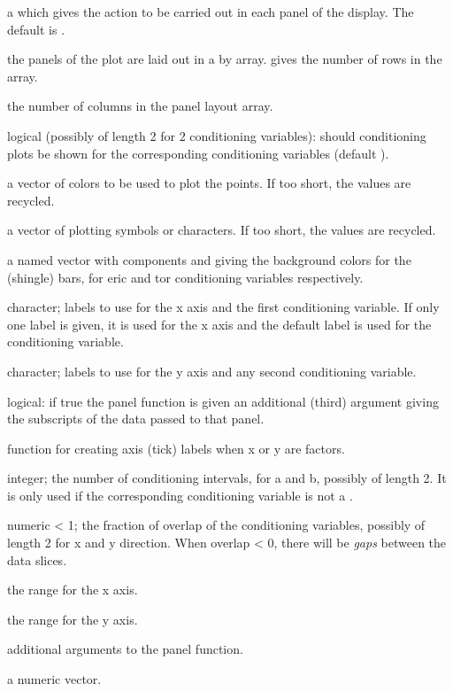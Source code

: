 \begin{Arguments}
\begin{ldescription}
\item[\code{panel}] a 
which gives the action to be carried out in
each panel of the display.  The default is .
\item[\code{rows}] the panels of the plot are laid out in a  by
 array.   gives the number of rows in the
array.
\item[\code{columns}] the number of columns in the panel layout array.
\item[\code{show.given}] logical (possibly of length 2 for 2 conditioning
variables): should conditioning plots be shown for the
corresponding conditioning variables (default ).
\item[\code{col}] a vector of colors to be used to plot the points.  If too
short, the values are recycled.
\item[\code{pch}] a vector of plotting symbols or characters.  If too short,
the values are recycled.
\item[\code{bar.bg}] a named vector with components  and
 giving the background colors for the (shingle) bars,
for eric and tor conditioning variables respectively.
\item[\code{xlab}] character; labels to use for the x axis and the
first conditioning variable.  If only one label is given, it is used
for the x axis and the default label is used for the conditioning
variable.
\item[\code{ylab}] character; labels to use for the y axis and any
second conditioning variable.
\item[\code{subscripts}] logical: if true the panel function is given an
additional (third) argument  giving the subscripts
of the data passed to that panel.
\item[\code{axlabels}] function for creating axis (tick) labels when x or y
are factors.
\item[\code{number}] integer; the number of conditioning intervals,
for a and b, possibly of length 2.  It is only used if the
corresponding conditioning variable is not a .
\item[\code{overlap}] numeric < 1; the fraction of overlap of the
conditioning variables, possibly of length 2 for x and y
direction.  When overlap < 0, there will be \emph{gaps} between
the data slices.
\item[\code{xlim}] the range for the x axis.
\item[\code{ylim}] the range for the y axis.
\item[\code{...}] additional arguments to the panel function.

\item[\code{x}] a numeric vector.
\end{ldescription}
\end{Arguments}
